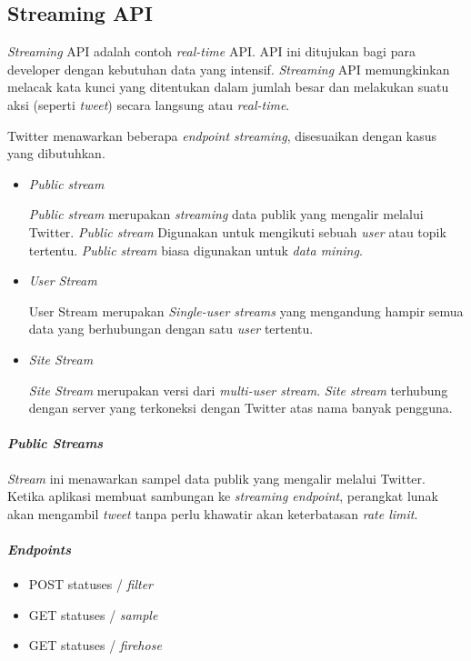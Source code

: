 \subsection{Streaming API}
\textit{Streaming} API adalah contoh \textit{real-time} API. API ini ditujukan bagi para developer dengan kebutuhan data yang intensif. \textit{Streaming} API memungkinkan melacak kata kunci yang ditentukan dalam jumlah besar dan melakukan suatu aksi (seperti \textit{tweet}) secara langsung atau \textit{real-time}.

Twitter menawarkan beberapa \textit{endpoint streaming}, disesuaikan dengan kasus yang dibutuhkan. 
\begin{itemize}
	\item \textit{Public stream}
	
	\textit{Public stream} merupakan \textit{streaming} data publik yang mengalir melalui Twitter. \textit{Public stream} Digunakan untuk mengikuti sebuah \textit{user} atau topik tertentu. \textit{Public stream} biasa  digunakan untuk \textit{data mining}.
	\item \textit{User Stream}
	
	{User Stream} merupakan \textit{Single-user streams} yang mengandung hampir semua data yang berhubungan dengan satu \textit{user} tertentu.
	
	\item \textit{Site Stream}
	
	\textit{Site Stream} merupakan versi dari \textit{multi-user stream}. \textit{Site stream} terhubung dengan server yang terkoneksi dengan Twitter atas nama banyak pengguna.
\end{itemize}


\paragraph{\textit{Public Streams}}
\textit{Stream} ini menawarkan sampel data publik yang mengalir melalui Twitter. Ketika aplikasi membuat sambungan ke \textit{streaming endpoint}, perangkat lunak akan mengambil \textit{tweet} tanpa perlu khawatir akan keterbatasan \textit{rate limit}.

\paragraph{\textit{Endpoints}}
	
	\begin{itemize}
		\item POST statuses / \textit{filter}
		\item GET statuses / \textit{sample}
		\item GET statuses / \textit{firehose}
	\end{itemize}

